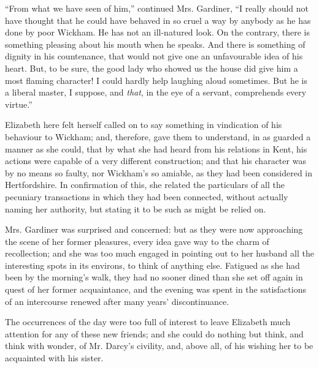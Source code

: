 ``From what we have seen of him,'' continued Mrs. Gardiner, ``I really should not have thought that he could have behaved in so cruel a way by anybody as he has done by poor Wickham. He has not an ill-natured look. On the contrary, there is something pleasing about his mouth when he speaks. And there is something of dignity in his countenance, that would not give one an unfavourable idea of his heart. But, to be sure, the good lady who showed us the house did give him a most flaming character! I could hardly help laughing aloud sometimes. But he is a liberal master, I suppose, and \textit{that}, in the eye of a servant, comprehends every virtue.''

Elizabeth here felt herself called on to say something in vindication of his behaviour to Wickham; and, therefore, gave them to understand, in as guarded a manner as she could, that by what she had heard from his relations in Kent, his actions were capable of a very different construction; and that his character was by no means so faulty, nor Wickham's so amiable, as they had been considered in Hertfordshire. In confirmation of this, she related the particulars of all the pecuniary transactions in which they had been connected, without actually naming her authority, but stating it to be such as might be relied on.

Mrs. Gardiner was surprised and concerned: but as they were now approaching the scene of her former pleasures, every idea gave way to the charm of recollection; and she was too much engaged in pointing out to her husband all the interesting spots in its environs, to think of anything else. Fatigued as she had been by the morning's walk, they had no sooner dined than she set off again in quest of her former acquaintance, and the evening was spent in the satisfactions of an intercourse renewed after many years' discontinuance.

The occurrences of the day were too full of interest to leave Elizabeth much attention for any of these new friends; and she could do nothing but think, and think with wonder, of Mr. Darcy's civility, and, above all, of his wishing her to be acquainted with his sister.

